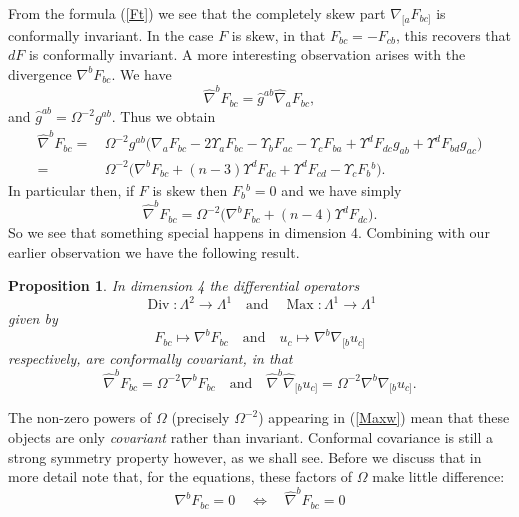\documentclass[a4paper,12pt]{amsart}
\newtheorem{proposition}[theorem]{Proposition}
\theoremstyle{remark}
\newcommand{\nn}[1]{(\ref{#1})}
\begin{document}
{From} the formula \nn{Ft} we see that the completely skew part
$\nabla_{[a}F_{bc]}$ is conformally invariant. In the case $F$ is
skew, in that $F_{bc}=-F_{cb}$, this recovers that $dF$ is conformally
invariant. A more interesting observation arises with 
 the
divergence $\nabla^b F_{bc}$.  We have
$$
\widehat{\nabla}^b F_{bc}= \widehat{g}^{ab} \widehat{\nabla}_a F_{bc}, 
$$
and $\widehat{g}^{ab}= \Omega^{-2}g^{ab}$. Thus we obtain 
\begin{equation}\nonumber
\begin{split} \widehat{\nabla}^b F_{bc}=&\, 
    \Omega^{-2}g^{ab}\big( \nabla_a F_{bc}-
2\Upsilon_a F_{bc} -\Upsilon_b F_{ac}-\Upsilon_c F_{ba} + \Upsilon^d
F_{d c}g_{ab} + \Upsilon^d F_{b d}g_{ac} \big)\\
=&\,\Omega^{-2}\big( \nabla^b F_{bc} + (n- 3)\Upsilon^d
F_{d c}+   \Upsilon^d
F_{cd}-\Upsilon_c 
F_{b}{}^b \big).
\end{split}
\end{equation} 
In particular then, if $F$ is skew then
$F_{b}{}^b=0$ and we have simply
\begin{equation}\label{Divt}
 \widehat{\nabla}^b F_{bc}=\Omega^{-2}\big( \nabla^b F_{bc} + (n- 4)\Upsilon^d
F_{d c}\big).
\end{equation}
So we see that something special happens in dimension 4. Combining with 
our earlier observation we have the following result.
\begin{proposition}\label{EM}
In dimension 4 the differential operators 
$$
\operatorname{Div}:\Lambda^2\to \Lambda^1 \quad \mbox{and} \quad 
\operatorname{Max}:\Lambda^1\to \Lambda^1
$$
given by 
$$
F_{ bc}\mapsto \nabla^b F_{ bc}\quad \mbox{and} \quad u_c \mapsto 
\nabla^b\nabla_{[b}u_{c]}
$$
respectively, are conformally covariant, in that 
\begin{equation}\label{Maxw}
 \widehat{\nabla}^b F_{bc}=\Omega^{-2} \nabla^b F_{bc}\quad
\mbox{and} \quad \widehat{\nabla}^b \widehat{\nabla}_{[b} u_{c]}=
\Omega^{-2} \nabla^b \nabla_{[b}u_{c]}.
\end{equation}
\end{proposition}
The non-zero powers of $\Omega$ (precisely $\Omega^{-2}$)
appearing in \nn{Maxw} mean that these objects are only {\em
  covariant} rather than invariant. Conformal covariance is still a
strong symmetry property however, as we shall see. Before we discuss
that in more detail note that, for the equations, these factors of
$\Omega$ make little difference: 
$$
\nabla^b F_{bc}=0 \quad \Leftrightarrow \quad \widehat{\nabla}^b F_{bc}=0
$$
\end{document}
